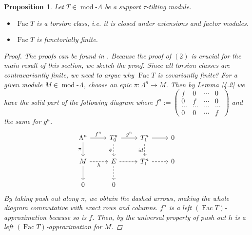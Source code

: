 \documentclass[12pt]{amsart}
\numberwithin{equation}{section}
\newtheorem{proposition}[lemma]{Proposition}
\theoremstyle{definition}
\DeclareMathOperator{\modd}{mod}
\DeclareMathOperator{\Fac}{Fac}
\newtheorem*{theorem 0*}{Theorem}
\newtheorem*{theorem a*}{Theorem A}
\newtheorem*{theorem b*}{Theorem B}
\newcounter{diagram}
\numberwithin{diagram}{section}
\begin{document}
\begin{proposition}\label{4.3}
Let $T\in \modd\text{-}\Lambda$ be a support $\tau$-tilting module.
\begin{itemize}
\item[(1)]
$\Fac T$ is a torsion class, i.e. it is closed under extensions and factor modules.
\item[(2)]
$\Fac T$ is functorially finite.
\end{itemize}
\begin{proof}
The proofs can be found in \cite{AIR}.
Because the proof of $(2)$ is crucial for the main result of this section, we sketch the proof.
Since all torsion classes are contravariantly finite, we need to argue why $\Fac T$ is covariantly finite?
For a given module $M\in\modd\text{-}\Lambda$, choose an epic $\pi:\Lambda^n\rightarrow M$.
Then by Lemma \ref{4.2} we have the solid part of the following diagram where $f^n:=\begin{pmatrix}
f&0&\cdots&0\\
0&f&\cdots&0\\
\ldots&\ldots&\ldots&\ldots\\
0&0&\cdots&f
\end{pmatrix}$ and the same for $g^n$.
\[\begin{tikzcd}
	{\Lambda^n} & {T_0^n} & {T_1^n} & 0 \\
	M & E & {T_1^n} & 0 \\
	0 & 0
	\arrow["{f^n}", from=1-1, to=1-2]
	\arrow["\pi"', from=1-1, to=2-1]
	\arrow["{g^n}", from=1-2, to=1-3]
	\arrow["\phi"', dashed, from=1-2, to=2-2]
	\arrow[from=1-3, to=1-4]
	\arrow["id"', dashed, from=1-3, to=2-3]
	\arrow["h"', dashed, from=2-1, to=2-2]
	\arrow[from=2-1, to=3-1]
	\arrow[dashed, from=2-2, to=2-3]
	\arrow[dashed, from=2-2, to=3-2]
	\arrow[dashed, from=2-3, to=2-4]
\end{tikzcd}\]
By taking push out along $\pi$, we obtain the dashed arrows, making the whole diagram commutative with exact rows and columns. $f^n$ is a left $(\Fac T)$-approximation because so is $f$. Then, by the universal property of push out $h$ is a left $(\Fac T)$-approximation for $M$.
\end{proof}
\end{proposition}
\end{document}
